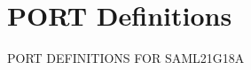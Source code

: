 \hypertarget{group___s_a_m_l21_g18_a__port}{}\section{P\+O\+R\+T Definitions}
\label{group___s_a_m_l21_g18_a__port}
P\+O\+R\+T D\+E\+F\+I\+N\+I\+T\+I\+O\+N\+S F\+O\+R S\+A\+M\+L21\+G18\+A 